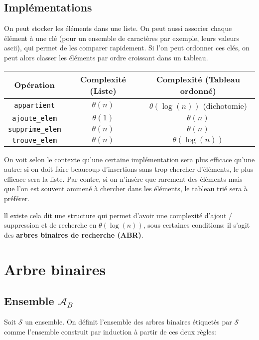 \documentclass{scrartcl}
\begin{document}
		\subsection{Implémentations}
			On peut stocker les éléments dans une liste. 
			On peut aussi associer chaque élément à une clé
			(pour un ensemble de caractères par exemple, leurs valeurs ascii),
			qui permet de les comparer rapidement. 
			Si l'on peut ordonner ces clés, 
			on peut alors classer les éléments par ordre croissant dans un tableau.

			\begin{center}
			\begin{tabular}{| c | c  | c |}
				\hline
				Opération & Complexité (Liste) & Complexité (Tableau ordonné) \\
				\hline
				\texttt{appartient} & $\theta(n)$ & $\theta(\log(n))$ (dichotomie) \\
				\hline
				\texttt{ajoute\_elem} & $\theta(1)$ & $\theta(n)$ \\
				\hline
				\texttt{supprime\_elem} & $\theta(n)$ & $\theta(n)$ \\
				\hline
				\texttt{trouve\_elem} & $\theta(n)$ & $\theta(\log(n))$ \\
				\hline
			\end{tabular}
			\end{center}

			\rem On voit selon le contexte qu'une certaine implémentation sera plus efficace qu'une autre:
			si on doit faire beaucoup d'insertions sans trop chercher d'éléments, le plus efficace sera la liste.
			Par contre, si on n'insère que rarement des éléments mais que 
			l'on est souvent ammené à chercher dans les éléments, le tableau trié sera à préférer.

			ll existe cela dit une structure qui permet d'avoir une complexité d'ajout / suppression et de recherche
			en $\theta(\log(n))$, sous certaines conditions: il s'agit des \textbf{arbres binaires de recherche (ABR)}.

	\section{Arbre binaires}
		\subsection{Ensemble $\mathscr{A}_B$}
			Soit $\mathcal{S}$ un ensemble.
			On définit l'ensemble des arbres binaires étiquetés par $\mathcal{S}$ 
			comme l'ensemble construit par induction à partir de ces deux règles:
\end{document}
